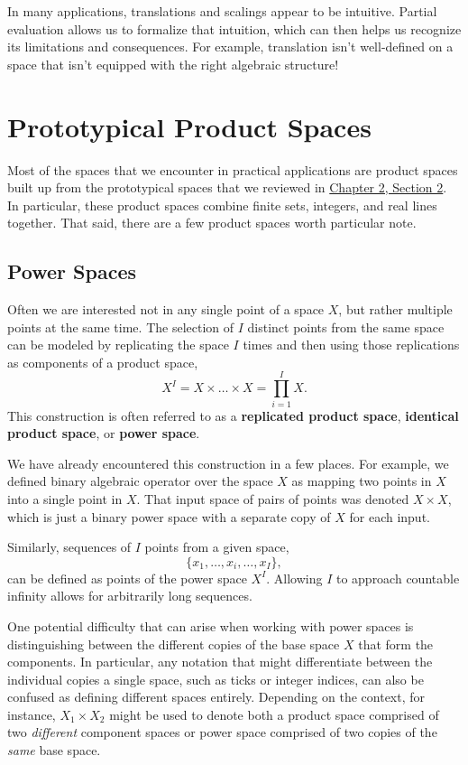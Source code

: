 \documentclass[
  letterpaper,
  DIV=11,
  numbers=noendperiod]{scrartcl}
\begin{document}
In many applications, translations and scalings appear to be intuitive.
Partial evaluation allows us to formalize that intuition, which can then
helps us recognize its limitations and consequences. For example,
translation isn't well-defined on a space that isn't equipped with the
right algebraic structure!

\section{Prototypical Product Spaces}\label{prototypical-product-spaces}

Most of the spaces that we encounter in practical applications are
product spaces built up from the prototypical spaces that we reviewed in
\href{http://www.symplectomorphic.com/assets/chapters_html/spaces.html\#sec:proto-spaces}{Chapter
2, Section 2}. In particular, these product spaces combine finite sets,
integers, and real lines together. That said, there are a few product
spaces worth particular note.

\subsection{Power Spaces}\label{power-spaces}

Often we are interested not in any single point of a space \(X\), but
rather multiple points at the same time. The selection of \(I\) distinct
points from the same space can be modeled by replicating the space \(I\)
times and then using those replications as components of a product
space, \[
X^{I} = X \times \ldots \times X = \prod_{i = 1}^{I} X.
\] This construction is often referred to as a \textbf{replicated
product space}, \textbf{identical product space}, or \textbf{power
space}.

We have already encountered this construction in a few places. For
example, we defined binary algebraic operator over the space \(X\) as
mapping two points in \(X\) into a single point in \(X\). That input
space of pairs of points was denoted \(X \times X\), which is just a
binary power space with a separate copy of \(X\) for each input.

Similarly, sequences of \(I\) points from a given space, \[
\{ x_{1}, \ldots, x_{i}, \ldots, x_{I} \},
\] can be defined as points of the power space \(X^{I}\). Allowing \(I\)
to approach countable infinity allows for arbitrarily long sequences.

One potential difficulty that can arise when working with power spaces
is distinguishing between the different copies of the base space \(X\)
that form the components. In particular, any notation that might
differentiate between the individual copies a single space, such as
ticks or integer indices, can also be confused as defining different
spaces entirely. Depending on the context, for instance,
\(X_{1} \times X_{2}\) might be used to denote both a product space
comprised of two \emph{different} component spaces or power space
comprised of two copies of the \emph{same} base space.
\end{document}
